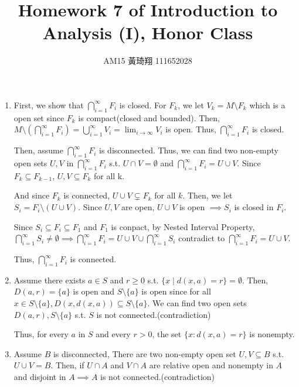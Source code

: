 \documentclass[12pt]{article}
\title{Homework 7 of Introduction to Analysis (I), Honor Class}
\author{AM15 黃琦翔 111652028}
\begin{document}
\maketitle
\begin{enumerate}
    \item First, we show that $\displaystyle\bigcap_{i=1}^{\infty} F_i$ is closed.
    For $F_k$, we let $V_k = M\setminus F_k$ which is a open set since $F_k$ is compact(closed and bounded).
    Then, $M \setminus\displaystyle(\bigcap_{i=1}^{\infty} F_i)= \displaystyle\bigcup_{i=1}^{\infty} V_i = \displaystyle\lim_{i\to \infty} V_i$  is open.
    Thus, $\displaystyle\bigcap_{i=1}^{\infty} F_i$ is closed.

    Then, assume $\displaystyle\bigcap_{i=1}^{\infty} F_i$ is disconnected. 
    Thus, we can find two non-empty open sets $U, V$ in $\displaystyle\bigcap_{i=1}^{\infty} F_i$ s.t. $U\cap V = \emptyset$ and $\displaystyle\bigcap_{i=1}^{\infty} F_i = U \cup V$.
    Since $F_k \subseteq F_{k-1}$, $U, V \subseteq F_k$ for all k.

    And since $F_k$ is connected, $U \cup V \subsetneq F_k$ for all $k$.
    Then, we let $S_i  = F_i \setminus (U \cup V)$.
    Since $U, V$ are open, $U \cup V$ is open $\implies S_i$ is closed in $F_i$.

    Since $S_i\subseteq F_i \subseteq F_1$ and $F_1$ is conpact, by Nested Interval Property,
    $\displaystyle\bigcap_{i=1}^{\infty} S_i \neq \emptyset\implies \displaystyle\bigcap_{i=1}^{\infty} F_i = U \cup V \cup \displaystyle\bigcap_{i=1}^{\infty} S_i$ 
    contradict to $\displaystyle\bigcap_{i=1}^{\infty} F_i = U \cup V$.

    Thus, $\displaystyle\bigcap_{i=1}^{\infty} F_i$ is connected.

    \item  Assume there exists $a \in S$ and $r \geq 0$ s.t. $\lbrace x \mid d(x, a) = r\rbrace = \emptyset$.
    Then, $D(a, r) = \lbrace a \rbrace$ is open and $S \setminus \lbrace a \rbrace$ is open 
    since for all $x \in S\setminus\lbrace a \rbrace, D(x, d(x, a)) \subseteq S \setminus\lbrace a \rbrace$.
    We can find two open sets $D(a, r), S \setminus \lbrace a \rbrace$ s.t. $S$ is not connected.(contradiction)

    Thus, for every $a$ in $S$ and every $r > 0$, the set $\lbrace x : d(x, a) = r\rbrace$ is nonempty.

    \newpage
    \item Assume $B$ is disconnected, There are two non-empty open set $U, V\subseteq B$ s.t. $U \cup V = B$.
    Then, if $U \cap A$ and $V \cap A$ are relative open and nonempty in $A$ and disjoint in $A\implies A$ is not connected.(contradiction)


\end{enumerate}
\end{document}
